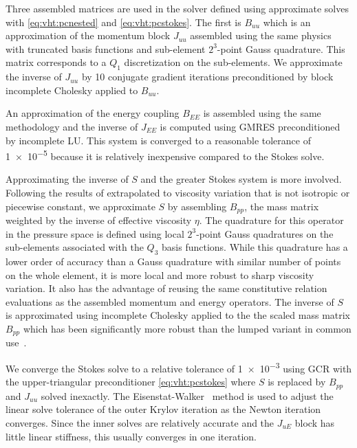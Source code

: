 Three assembled matrices are used in the solver defined using approximate solves with \eqref{eq:vht:pcnested} and \eqref{eq:vht:pcstokes}.
The first is $B_{uu}$ which is an approximation of the momentum block $J_{uu}$ assembled using the same physics with truncated basis functions and sub-element $2^3$-point Gauss quadrature.
This matrix corresponds to a $Q_1$ discretization on the sub-elements.
We approximate the inverse of $J_{uu}$ by 10 conjugate gradient iterations preconditioned by block incomplete Cholesky applied to $B_{uu}$.

An approximation of the energy coupling $B_{EE}$ is assembled using the same methodology and the inverse of $J_{EE}$ is computed using GMRES preconditioned by incomplete LU.
This system is converged to a reasonable tolerance of \num{1e-5} because it is relatively inexpensive compared to the Stokes solve.

Approximating the inverse of $S$ and the greater Stokes system is more involved.
Following the results of \citep{olshanskii2006analysis} extrapolated to viscosity variation that is not isotropic or piecewise constant, we approximate $S$ by assembling $B_{pp}$, the mass matrix weighted by the inverse of effective viscosity $\eta$.
The quadrature for this operator in the pressure space is defined using local $2^3$-point Gauss quadratures on the sub-elements associated with the $Q_3$ basis functions.
While this quadrature has a lower order of accuracy than a Gauss quadrature with similar number of points on the whole element, it is more local and more robust to sharp viscosity variation.
It also has the advantage of reusing the same constitutive relation evaluations as the assembled momentum and energy operators.
The inverse of $S$ is approximated using incomplete Cholesky applied to the the scaled mass matrix $B_{pp}$ which has been significantly more robust than the lumped variant in common use~\citep[\eg][]{burstedde2008scalable,may2008pim}.

We converge the Stokes solve to a relative tolerance of \num{1e-3} using GCR with the upper-triangular preconditioner \eqref{eq:vht:pcstokes} where $S$ is replaced by $B_{pp}$ and $J_{uu}$ solved inexactly.
The Eisenstat-Walker~\citet*{eisenstat1996cft} method is used to adjust the linear solve tolerance of the outer Krylov iteration as the Newton iteration converges.
Since the inner solves are relatively accurate and the $J_{uE}$ block has little linear stiffness, this usually converges in one iteration.

